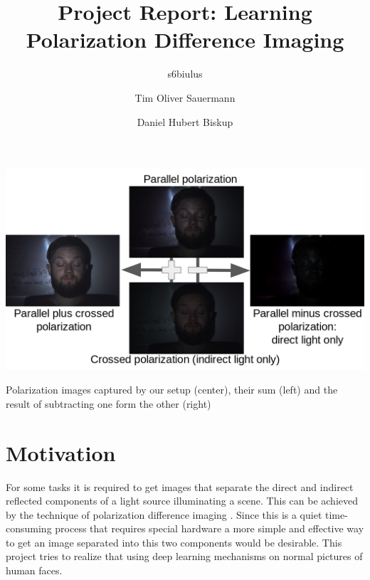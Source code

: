 \documentclass[sigconf]{acmart}
\begin{document}
\title{Project Report: Learning Polarization Difference Imaging}

\author{s6biulus}

\author{Tim Oliver Sauermann}

\author{Daniel Hubert Biskup}


\begin{teaserfigure}
  \centering
  \includegraphics[width=6.0in]{figures/teaser.png}
  \caption{Polarization images captured by our setup (center), their sum (left) and the result of subtracting one form the other (right)}
  \label{fig:teaser}
\end{teaserfigure}

\maketitle

\section{Motivation}
For some tasks it is required to get images that separate the direct and indirect reflected components of a light source illuminating a scene. This can be achieved by the technique of polarization difference imaging \cite{PDI}. Since this is a quiet time-consuming process that requires special hardware a more simple and effective way to get an image separated into this two components would be desirable. This project tries to realize that using deep learning mechanisms on normal pictures of human faces.
\end{document}
